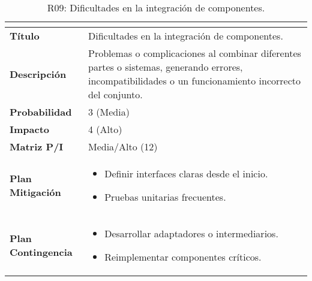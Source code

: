 \begin{table}[H]
\centering
\begin{tabular}{|>{\bfseries}l|p{10cm}|}
\hline
\rowcolor{lightgray}
\multicolumn{2}{|c|}{\textbf{Riesgo R09}} \\ \hline
Título & Dificultades en la integración de componentes.\\ \hline
Descripción & Problemas o complicaciones al combinar diferentes partes o sistemas, generando errores, incompatibilidades o un funcionamiento incorrecto del conjunto. \\ \hline
Probabilidad & 3 (Media) \\ \hline
Impacto & 4 (Alto) \\ \hline
Matriz P/I & Media/Alto (12)\\ \hline
Plan Mitigación & 
\begin{itemize}
\item Definir interfaces claras desde el inicio.
\item Pruebas unitarias frecuentes.
\end{itemize} \\ \hline
Plan Contingencia & 
\begin{itemize}
\item Desarrollar adaptadores o intermediarios.
\item Reimplementar componentes críticos.
\end{itemize} \\ \hline
\end{tabular}
\caption{R09: Dificultades en la integración de componentes.}
\label{tab:R09}
\end{table}

